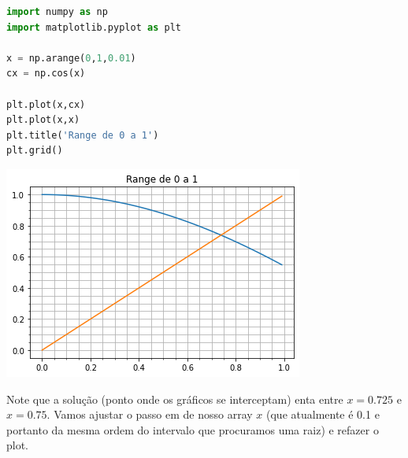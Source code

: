 \begin{minipage}{0.45\linewidth}
\begin{lstlisting}[language = Python]
import numpy as np
import matplotlib.pyplot as plt

x = np.arange(0,1,0.01)
cx = np.cos(x)

plt.plot(x,cx)
plt.plot(x,x)
plt.title('Range de 0 a 1')
plt.grid()
\end{lstlisting}
\end{minipage}
\hspace{0.05 \linewidth}
\begin{minipage}{0.45\linewidth}
\includegraphics[scale=0.4]{Images/range1.png}
\end{minipage}

Note que a solução (ponto onde os gráficos se interceptam) enta entre $x=0.725$ e $x=0.75$. Vamos ajustar o passo em de nosso array $x$ (que atualmente é 0.1 e portanto da mesma ordem do intervalo que procuramos uma raiz)  e refazer o plot. 

